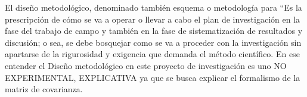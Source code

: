 \documentclass[../Main.tex]{subfiles}
\begin{document}
El diseño metodológico, denominado también esquema o metodología para \citep{2019} “Es la prescripción de cómo se va a operar o llevar a cabo el plan de investigación en la fase del trabajo de campo y también en la fase de sistematización de resultados y discusión; o sea, se debe bosquejar como se va a proceder con la investigación sin apartarse de la rigurosidad y exigencia que demanda el método científico. En ese entender el Diseño metodológico en este proyecto de investigación es uno NO EXPERIMENTAL, EXPLICATIVA ya que se busca explicar el formalismo de la matriz de covarianza.
\biblio %
\end{document}
